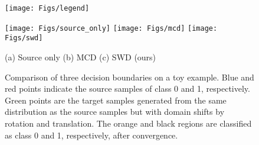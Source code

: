 \documentclass[10pt,twocolumn,letterpaper]{article}
\begin{document}
\vspace{-1mm}
\begin{figure}[h]
\hspace{0.05mm} \texttt{[image: Figs/legend]}
\vspace{-7mm}
\end{figure}

\begin{figure}[h]
\begin{center}
\texttt{[image: Figs/source\_only]}
\texttt{[image: Figs/mcd]}
\texttt{[image: Figs/swd]}
\end{center}
\vspace{-4mm}
\small \hspace{3mm} (a) Source only \hspace{10mm} (b) MCD  \hspace{12mm} (c) SWD (ours)
\vspace{-2mm}
   \caption{Comparison of three decision boundaries on a toy example. Blue and red points indicate the source samples of class 0 and 1, respectively. Green points are the target samples generated from the same distribution as the source samples but with domain shifts by rotation and translation. The orange and black regions are classified as class 0 and 1, respectively, after convergence.}
\label{fig:toy}
\end{figure}
\end{document}
